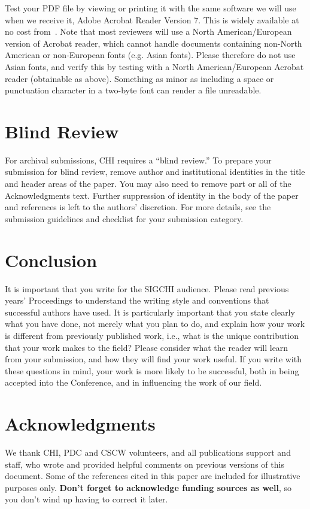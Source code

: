 \documentclass{sigchi}
\begin{document}
Test your PDF file by viewing or printing it with the same software we
will use when we receive it, Adobe Acrobat Reader Version 7. This is
widely available at no cost from~\cite{acrobat}.  Note that most
reviewers will use a North American/European version of Acrobat
reader, which cannot handle documents containing non-North American or
non-European fonts (e.g. Asian fonts).  Please therefore do not use
Asian fonts, and verify this by testing with a North American/European
Acrobat reader (obtainable as above). Something as minor as including
a space or punctuation character in a two-byte font can render a file
unreadable.

\section{Blind Review}

For archival submissions, CHI requires a ``blind review.'' To prepare
your submission for blind review, remove author and institutional
identities in the title and header areas of the paper. You may also
need to remove part or all of the Acknowledgments text.  Further
suppression of identity in the body of the paper and references is
left to the authors' discretion. For more details, see the submission
guidelines and checklist for your submission category.

\section{Conclusion}

It is important that you write for the SIGCHI audience.  Please read
previous years' Proceedings to understand the writing style and
conventions that successful authors have used.  It is particularly
important that you state clearly what you have done, not merely what
you plan to do, and explain how your work is different from previously
published work, i.e., what is the unique contribution that your work
makes to the field?  Please consider what the reader will learn from
your submission, and how they will find your work useful.  If you
write with these questions in mind, your work is more likely to be
successful, both in being accepted into the Conference, and in
influencing the work of our field.

\section{Acknowledgments}

We thank CHI, PDC and CSCW volunteers, and all publications support
and staff, who wrote and provided helpful comments on previous
versions of this document.  Some of the references cited in this paper
are included for illustrative purposes only.  \textbf{Don't forget
to acknowledge funding sources as well}, so you don't wind up
having to correct it later.
\end{document}
